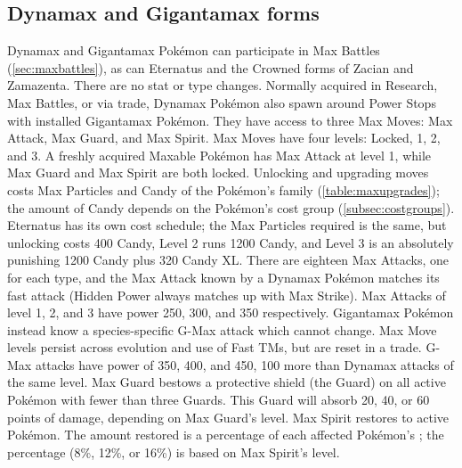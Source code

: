\subsection{Dynamax and Gigantamax forms\label{sec:dmaxgmax}}
Dynamax and Gigantamax Pokémon can participate in Max Battles (\autoref{sec:maxbattles}),
 as can Eternatus and the Crowned forms of Zacian and Zamazenta.
There are no stat or type changes.
Normally acquired in Research, Max Battles, or via trade,
 Dynamax Pokémon also spawn around Power Stops with installed Gigantamax Pokémon.
They have access to three Max Moves: Max Attack, Max Guard, and Max Spirit.
Max Moves have four levels: Locked, 1, 2, and 3.
A freshly acquired Maxable Pokémon has Max Attack at level 1, while Max Guard and Max Spirit are both locked.
Unlocking and upgrading moves costs Max Particles and Candy of the Pokémon's family (\autoref{table:maxupgrades});
 the amount of Candy depends on the Pokémon's cost group (\autoref{subsec:costgroups}).
Eternatus has its own cost schedule; the Max Particles required is the same,
 but unlocking costs 400 Candy, Level 2 runs 1200 Candy, and
 Level 3 is an absolutely punishing 1200 Candy plus 320 Candy XL.
There are eighteen Max Attacks, one for each type, and the Max Attack known by a Dynamax Pokémon matches its fast attack
 (Hidden Power always matches up with Max Strike).
Max Attacks of level 1, 2, and 3 have power 250, 300, and 350 respectively.
Gigantamax Pokémon instead know a species-specific G-Max attack which cannot change.
Max Move levels persist across evolution and use of Fast TMs, but are reset in a trade.
G-Max attacks have power of 350, 400, and 450, 100 more than Dynamax attacks of the same level.
Max Guard bestows a protective shield (the Guard) on all active Pokémon
  with fewer than three Guards.
This Guard will absorb 20, 40, or 60 points of damage, depending on Max Guard's level.
Max Spirit restores \HP{} to active Pokémon.
The amount restored is a percentage of each affected Pokémon's \MHP\@;
  the percentage (8\%, 12\%, or 16\%) is based on Max Spirit's level.

